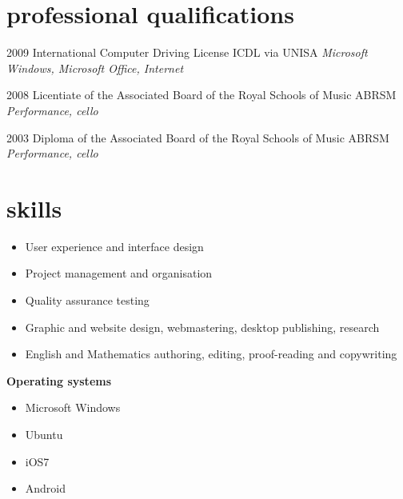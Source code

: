 \documentclass[]{friggeri-cv} %
\begin{document}
\section{professional qualifications}

\begin{entrylist}
\entry
{2009}
{International Computer Driving License}
{ICDL via UNISA}
{\emph{Microsoft Windows, Microsoft Office, Internet}}

\entry
{2008}
{Licentiate of the Associated Board of the Royal Schools of Music}
{ABRSM}
{\emph{Performance, cello}}

\entry
{2003}
{Diploma of the Associated Board of the Royal Schools of Music}
{ABRSM}
{\emph{Performance, cello}}

\end{entrylist}


\section{skills}

\begin{itemize}
\item User experience and interface design
\item Project management and organisation
\item Quality assurance testing
\item Graphic and website design, webmastering, desktop publishing, research
\item English and Mathematics authoring, editing, proof-reading and copywriting

\end{itemize}

\textbf{Operating systems}
\begin{multicols}{2}
\begin{itemize}
 \item Microsoft Windows
 \item Ubuntu
 \item iOS7
 \item Android
\end{itemize}
\end{multicols}
\end{document}
